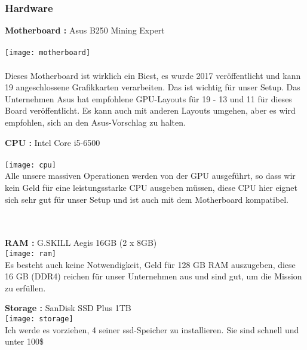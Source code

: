 \documentclass[ngerman]{scrreprt}
\begin{document}
\subsubsection{Hardware}
\begin{large}
	\textbf{Motherboard :} Asus B250 Mining Expert \\ \\
	\texttt{[image: motherboard]}  \\ \\
	Dieses Motherboard ist wirklich ein Biest, es wurde 2017 veröffentlicht und kann 19 angeschlossene Grafikkarten verarbeiten. Das ist wichtig für unser Setup.
	Das Unternehmen Asus hat empfohlene GPU-Layouts für 19 - 13 und 11 für dieses Board veröffentlicht. Es kann auch mit anderen Layouts umgehen, aber es wird empfohlen, sich an den Asus-Vorschlag zu halten.
	
\end{large}
\newpage
\begin{large}
	\textbf{CPU :} Intel Core i5-6500 \\ \\
	\texttt{[image: cpu]}  \\ 
	Alle unsere massiven Operationen werden von der GPU ausgeführt, so dass wir kein Geld für eine leistungsstarke CPU ausgeben müssen, diese CPU hier eignet sich sehr gut für unser Setup und ist auch mit dem Motherboard kompatibel. \\ \\ \\
	
\end{large}
\begin{large}
	\textbf{RAM :} G.SKILL Aegis 16GB (2 x 8GB) \\ 
	\texttt{[image: ram]}  \\
	Es besteht auch keine Notwendigkeit, Geld für 128 GB RAM auszugeben, diese 16 GB (DDR4) reichen für unser Unternehmen aus und sind gut, um die Mission zu erfüllen. \\
	
	
	
\end{large}
\newpage
\begin{large}
	\textbf{Storage :} SanDisk SSD Plus 1TB \\ 
	\texttt{[image: storage]}  \\
	Ich werde es vorziehen, 4 seiner ssd-Speicher zu installieren. Sie sind schnell und unter 100\$	\\
\end{large}
\end{document}
